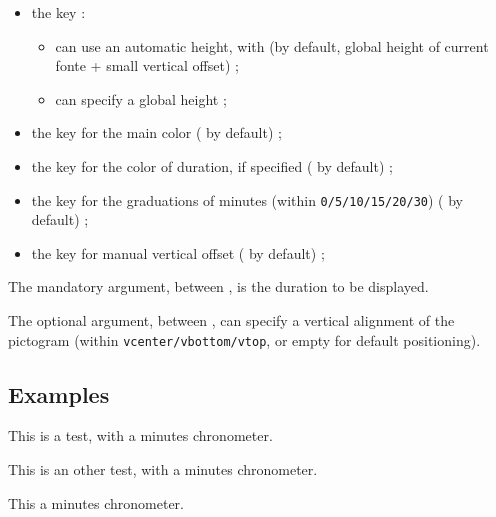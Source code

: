 \documentclass[english,11pt,a4paper]{article}
\begin{document}
\begin{itemize}
	\item the key  :
	\begin{itemize}
		\item can use an automatic height, with  (by default, global height of current fonte + small vertical offset) ;
		\item can specify a global height ;
	\end{itemize}
	\item the key  for the main color ( by default) ;
	\item the key  for the color of duration, if specified ( by default) ;
	\item the key  for the graduations of minutes (within \texttt{0/5/10/15/20/30}) ( by default) ;
	\item the key  for manual vertical offset ( by default) ;
\end{itemize}

\medskip

The mandatory argument, between , is the duration to be displayed.

\medskip

The optional argument, between , can specify a vertical alignment of the pictogram (within \texttt{vcenter/vbottom/vtop}, or empty for default positioning).

\subsection{Examples}

\begin{demohigh}[language=latex/latex2,style/main=cyan!10,style/code=cyan!10]
This is a test, with a  minutes chronometer.
\end{demohigh}

\begin{demohigh}[language=latex/latex2,style/main=cyan!10,style/code=cyan!10]
{\Huge This is an other test, with a 
 minutes chronometer.}
\end{demohigh}

\begin{demohigh}[language=latex/latex2,style/main=cyan!10,style/code=cyan!10]
This a  minutes chronometer.
\end{demohigh}
\end{document}
